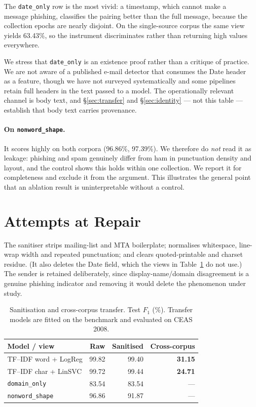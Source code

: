 \documentclass[twoside,11pt]{article}
\newcommand{\gd}[1]{\textbf{#1}}
\begin{document}
The \texttt{date\_only} row is the most vivid: a timestamp, which cannot make
a message phishing, classifies the pairing better than the full message,
because the collection epochs are nearly disjoint. On the single-source corpus
the same view yields 63.43\%, so the instrument discriminates rather than
returning high values everywhere.

We stress that \texttt{date\_only} is an existence proof rather than a
critique of practice. We are not aware of a published e-mail detector that
consumes the Date header as a feature, though we have not surveyed
systematically and some pipelines retain full headers in the text passed to a
model. The
operationally relevant channel is body text, and \S\ref{sec:transfer} and
\S\ref{sec:identity} --- not this table --- establish that body text carries
provenance.

\paragraph{On \texttt{nonword\_shape}.} It scores highly on both corpora
(96.86\%, 97.39\%). We therefore do \emph{not} read it as leakage: phishing
and spam genuinely differ from ham in punctuation density and layout, and the
control shows this holds within one collection. We report it for completeness
and exclude it from the argument. This illustrates the general point that an
ablation result is uninterpretable without a control.

\section{Attempts at Repair}
\label{sec:repair}

The sanitiser strips mailing-list and MTA boilerplate; normalises
whitespace, line-wrap width and repeated punctuation; and clears
quoted-printable and charset residue. (It also deletes the Date field, which
the views in Table~\ref{tab:repair} do not use.) The sender is retained deliberately,
since display-name/domain disagreement is a genuine phishing indicator and
removing it would delete the phenomenon under study.

\begin{table}[t]
\centering\small
\caption{Sanitisation and cross-corpus transfer. Test $F_1$ (\%). Transfer
models are fitted on the benchmark and evaluated on CEAS 2008.}
\label{tab:repair}
\begin{tabular}{lrrr}
\toprule
Model / view & Raw & Sanitised & \gd{Cross-corpus} \\
\midrule
TF--IDF word + LogReg   & 99.82 & 99.40 & \gd{31.15} \\
TF--IDF char + LinSVC   & 99.72 & 99.44 & \gd{24.71} \\
\texttt{domain\_only}   & 83.54 & 83.54 & --- \\
\texttt{nonword\_shape} & 96.86 & 91.87 & --- \\
\bottomrule
\end{tabular}
\end{table}
\end{document}
